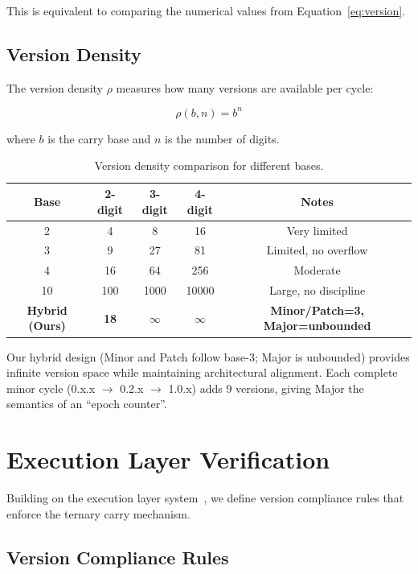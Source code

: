 \documentclass{article}
\begin{document}
This is equivalent to comparing the numerical values from Equation~\ref{eq:version}.

\subsection{Version Density}

The version density $\rho$ measures how many versions are available per cycle:

\begin{equation}
\label{eq:density}
\rho(b, n) = b^n
\end{equation}

where $b$ is the carry base and $n$ is the number of digits.

\begin{table}[h]
\centering
\caption{Version density comparison for different bases.}
\label{tab:density}
\begin{tabular}{ccccc}
\toprule
\textbf{Base} & \textbf{2-digit} & \textbf{3-digit} & \textbf{4-digit} & \textbf{Notes} \\
\midrule
2 & 4 & 8 & 16 & Very limited \\
3 & 9 & 27 & 81 & Limited, no overflow \\
4 & 16 & 64 & 256 & Moderate \\
10 & 100 & 1000 & 10000 & Large, no discipline \\
\textbf{Hybrid (Ours)} & \textbf{18} & \textbf{$\infty$} & \textbf{$\infty$} & \textbf{Minor/Patch=3, Major=unbounded} \\
\bottomrule
\end{tabular}
\end{table}

Our hybrid design (Minor and Patch follow base-3; Major is unbounded) provides infinite version space while maintaining architectural alignment. Each complete minor cycle (0.x.x $\to$ 0.2.x $\to$ 1.0.x) adds 9 versions, giving Major the semantics of an ``epoch counter''.

\section{Execution Layer Verification}

Building on the execution layer system~\cite{lsh-three-layer}, we define version compliance rules that enforce the ternary carry mechanism.

\subsection{Version Compliance Rules}
\end{document}
